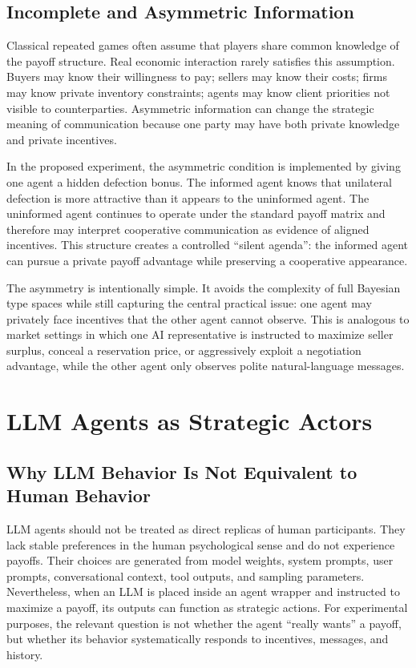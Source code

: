\documentclass[12pt,a4paper]{article}
\begin{document}
\subsection{Incomplete and Asymmetric Information}

Classical repeated games often assume that players share common knowledge of the payoff structure. Real economic interaction rarely satisfies this assumption. Buyers may know their willingness to pay; sellers may know their costs; firms may know private inventory constraints; agents may know client priorities not visible to counterparties. Asymmetric information can change the strategic meaning of communication because one party may have both private knowledge and private incentives.

In the proposed experiment, the asymmetric condition is implemented by giving one agent a hidden defection bonus. The informed agent knows that unilateral defection is more attractive than it appears to the uninformed agent. The uninformed agent continues to operate under the standard payoff matrix and therefore may interpret cooperative communication as evidence of aligned incentives. This structure creates a controlled ``silent agenda'': the informed agent can pursue a private payoff advantage while preserving a cooperative appearance.

The asymmetry is intentionally simple. It avoids the complexity of full Bayesian type spaces while still capturing the central practical issue: one agent may privately face incentives that the other agent cannot observe. This is analogous to market settings in which one AI representative is instructed to maximize seller surplus, conceal a reservation price, or aggressively exploit a negotiation advantage, while the other agent only observes polite natural-language messages.

\section{LLM Agents as Strategic Actors}

\subsection{Why LLM Behavior Is Not Equivalent to Human Behavior}

LLM agents should not be treated as direct replicas of human participants. They lack stable preferences in the human psychological sense and do not experience payoffs. Their choices are generated from model weights, system prompts, user prompts, conversational context, tool outputs, and sampling parameters. Nevertheless, when an LLM is placed inside an agent wrapper and instructed to maximize a payoff, its outputs can function as strategic actions. For experimental purposes, the relevant question is not whether the agent ``really wants'' a payoff, but whether its behavior systematically responds to incentives, messages, and history.
\end{document}
